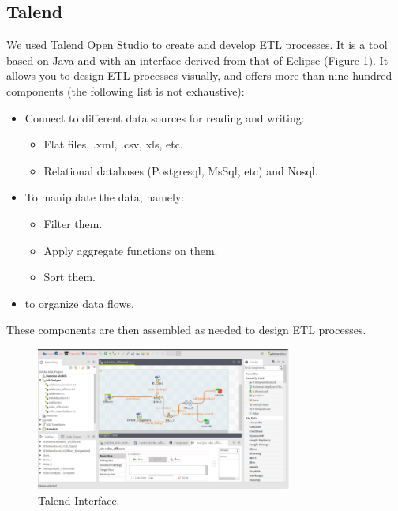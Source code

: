 \subsection{Talend}
\label{sec:talend}
We used  Talend Open Studio to create and develop ETL processes. It is a tool based on Java and with an interface derived from that of Eclipse (Figure \ref{fig:Talend}). It allows you to design ETL processes visually, and offers more than nine hundred components (the following list is not exhaustive)\cite{TalendOpenStudio}: 
\begin{itemize}
\item Connect to different data sources for reading and writing:
\begin{itemize}
\item Flat files, .xml, .csv, xls, etc.
\item Relational databases (Postgresql, MsSql, etc) and Nosql.
\end{itemize}
\item To manipulate the data, namely:
\begin{itemize}
\item Filter them.
\item Apply aggregate functions on them.
\item Sort them.
\end{itemize}
\item to organize data flows.
\end{itemize}
These components are then assembled as needed to design ETL processes\cite{mehdiPfe}.
\begin{figure}[h!]
    \center
    \includegraphics[width=0.75\textwidth]{images/chapter4/talendInterface.png}
    \caption{Talend Interface.}
    \label{fig:Talend}
\end{figure}
\newpage
